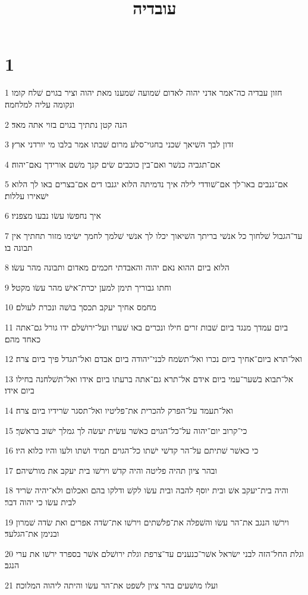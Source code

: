 

\title{עובדיה}


\chapter{1}

\par 1 חזון עבדיה כה־אמר אדני יהוה לאדום שׁמועה שׁמענו מאת יהוה וציר בגוים שׁלח קומו ונקומה עליה למלחמה׃
\par 2 הנה קטן נתתיך בגוים בזוי אתה מאד׃
\par 3 זדון לבך השׁיאך שׁכני בחגוי־סלע מרום שׁבתו אמר בלבו מי יורדני ארץ׃
\par 4 אם־תגביה כנשׁר ואם־בין כוכבים שׂים קנך משׁם אורידך נאם־יהוה׃
\par 5 אם־גנבים באו־לך אם־שׁודדי לילה איך נדמיתה הלוא יגנבו דים אם־בצרים באו לך הלוא ישׁאירו עללות׃
\par 6 איך נחפשׂו עשׂו נבעו מצפניו׃
\par 7 עד־הגבול שׁלחוך כל אנשׁי בריתך השׁיאוך יכלו לך אנשׁי שׁלמך לחמך ישׂימו מזור תחתיך אין תבונה בו׃
\par 8 הלוא ביום ההוא נאם יהוה והאבדתי חכמים מאדום ותבונה מהר עשׂו׃
\par 9 וחתו גבוריך תימן למען יכרת־אישׁ מהר עשׂו מקטל׃
\par 10 מחמס אחיך יעקב תכסך בושׁה ונכרת לעולם׃
\par 11 ביום עמדך מנגד ביום שׁבות זרים חילו ונכרים באו שׁערו ועל־ירושׁלם ידו גורל גם־אתה כאחד מהם׃
\par 12 ואל־תרא ביום־אחיך ביום נכרו ואל־תשׂמח לבני־יהודה ביום אבדם ואל־תגדל פיך ביום צרה׃
\par 13 אל־תבוא בשׁער־עמי ביום אידם אל־תרא גם־אתה ברעתו ביום אידו ואל־תשׁלחנה בחילו ביום אידו׃
\par 14 ואל־תעמד על־הפרק להכרית את־פליטיו ואל־תסגר שׂרידיו ביום צרה׃
\par 15 כי־קרוב יום־יהוה על־כל־הגוים כאשׁר עשׂית יעשׂה לך גמלך ישׁוב בראשׁך׃
\par 16 כי כאשׁר שׁתיתם על־הר קדשׁי ישׁתו כל־הגוים תמיד ושׁתו ולעו והיו כלוא היו׃
\par 17 ובהר ציון תהיה פליטה והיה קדשׁ וירשׁו בית יעקב את מורשׁיהם׃
\par 18 והיה בית־יעקב אשׁ ובית יוסף להבה ובית עשׂו לקשׁ ודלקו בהם ואכלום ולא־יהיה שׂריד לבית עשׂו כי יהוה דבר׃
\par 19 וירשׁו הנגב את־הר עשׂו והשׁפלה את־פלשׁתים וירשׁו את־שׂדה אפרים ואת שׂדה שׁמרון ובנימן את־הגלעד׃
\par 20 וגלת החל־הזה לבני ישׂראל אשׁר־כנענים עד־צרפת וגלת ירושׁלם אשׁר בספרד ירשׁו את ערי הנגב׃
\par 21 ועלו מושׁעים בהר ציון לשׁפט את־הר עשׂו והיתה ליהוה המלוכה׃


